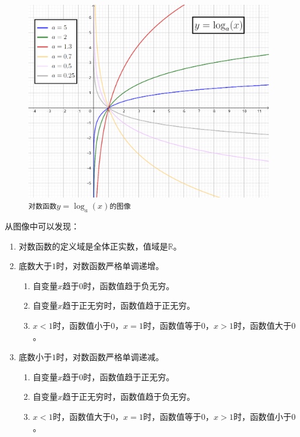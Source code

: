 \documentclass[12pt,UTF8]{ctexbook}
\begin{document}
\begin{figure}[h]
    \vspace{4pt}
    \centering
    \includegraphics[width=0.96\textwidth]{tu/对数函数1.png}
    \caption*{\texttt{对数函数}$y = \log_a(x)$\texttt{的图像}}
\end{figure}

从图像中可以发现：
\begin{enumerate}
    \item 对数函数的定义域是全体正实数，值域是$\mathbb{R}$。
    \item 底数大于$1$时，对数函数严格单调递增。
    \begin{enumerate}[label*=\arabic*.]
        \item 自变量$x$趋于$0$时，函数值趋于负无穷。
        \item 自变量$x$趋于正无穷时，函数值趋于正无穷。
        \item $x < 1$时，函数值小于$0$，$x = 1$时，函数值等于$0$，$x > 1$时，函数值大于$0$。
    \end{enumerate}
    \item 底数小于$1$时，对数函数严格单调递减。    
    \begin{enumerate}[label*=\arabic*.]
        \item 自变量$x$趋于$0$时，函数值趋于正无穷。
        \item 自变量$x$趋于正无穷时，函数值趋于负无穷。
        \item $x < 1$时，函数值大于$0$，$x = 1$时，函数值等于$0$，$x > 1$时，函数值小于$0$。
    \end{enumerate}
\end{enumerate}
\end{document}
